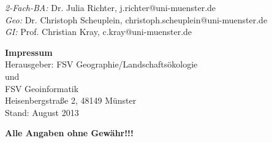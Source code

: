 \begin{tiny}
\begin{minipage}[t]{0.5\textwidth}
\begin{center}
\textit{2-Fach-BA:} Dr. Julia Richter, j.richter@uni-muenster.de\\
\textit{Geo:} Dr. Christoph Scheuplein, christoph.scheuplein@uni-muenster.de\\
\textit{GI:} Prof. Christian Kray, c.kray@uni-muenster.de\\
\bigskip
\bigskip
\end{center}
\end{minipage}
\begin{minipage}{\textwidth}
\hspace{0.08\textwidth}
\hspace{0.18\textwidth}
\end{minipage}
\end{tiny}
\bigskip
\begin{center}
\begin{small}
 \textbf{Impressum} \\ \bigskip
Herausgeber: FSV Geographie/Landschaftsökologie\\
und\\
FSV Geoinformatik\\
Heisenbergstraße 2, 48149 Münster\\
Stand: August 2013 \\
\end{small}
\begin{tiny}
\sffamily
\textbf{Alle Angaben ohne Gewähr!!!}
\end{tiny}
\end{center}
